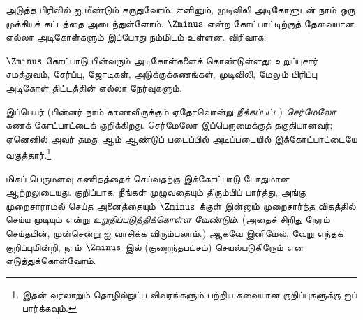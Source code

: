 \documentclass[../../../include/open-logic-section]{subfiles}
\begin{document}

அடுத்த பிரிவில் \stagesinf{} ஐ மீண்டும் கருதுவோம். எனினும், முடிவிலி
அடிகோளுடன் நாம் ஒரு முக்கியக் கட்டத்தை அடைந்துள்ளோம். $\Zminus$ என்ற
கோட்பாட்டிற்குத் தேவையான எல்லா அடிகோள்களும் இப்போது நம்மிடம் உள்ளன.
விரிவாக:

\begin{defn}
$\Zminus$ கோட்பாடு பின்வரும் அடிகோள்களைக் கொண்டுள்ளது: உறுப்புசார் சமத்துவம்,
சேர்ப்பு, ஜோடிகள், அடுக்குக்கணங்கள், முடிவிலி, மேலும் பிரிப்பு அடிகோள்
திட்டத்தின் எல்லா நேர்வுகளும்.
\end{defn}

இப்பெயர் (பின்னர் நாம் காணவிருக்கும் ஏதோவொன்று \emph{நீக்கப்பட்ட})
\emph{செர்மேலோ} கணக் கோட்பாட்டைக் குறிக்கிறது. செர்மேலோ இப்பெருமைக்குத்
தகுதியானவர்; ஏனெனில் அவர் தமது \citeyear{Zermelo1908Untersuchungen} ஆம்
ஆண்டுப் படைப்பில் அடிப்படையில் இக்கோட்பாட்டையே வகுத்தார்.\footnote{இதன்
வரலாறும் தொழில்நுட்ப விவரங்களும் பற்றிய சுவையான குறிப்புகளுக்கு
\citet[Appendix A]{Potter2004} ஐப் பார்க்கவும்.}

மிகப் பெருமளவு கணிதத்தைச் செய்வதற்கு இக்கோட்பாடு போதுமான ஆற்றலுடையது.
குறிப்பாக, நீங்கள்  முழுவதையும் திரும்பிப் பார்த்து,
அங்கு முறைசாராமல் செய்த அனைத்தையும் $\Zminus$ க்குள் இன்னும் முறைசார்ந்த
விதத்தில் செய்ய முடியும் என்று \emph{உறுதிப்படுத்திக்கொள்ள வேண்டும்}.
(அதைச் சிறிது நேரம் செய்தபின், முன்சென்று
 ஐ வாசிக்க விரும்பலாம்.) ஆகவே
இனிமேல், வேறு எந்தக் குறிப்புமின்றி, நாம் $\Zminus$ இல் (குறைந்தபட்சம்)
செயல்படுகிறோம் என எடுத்துக்கொள்வோம்.
\end{document}
